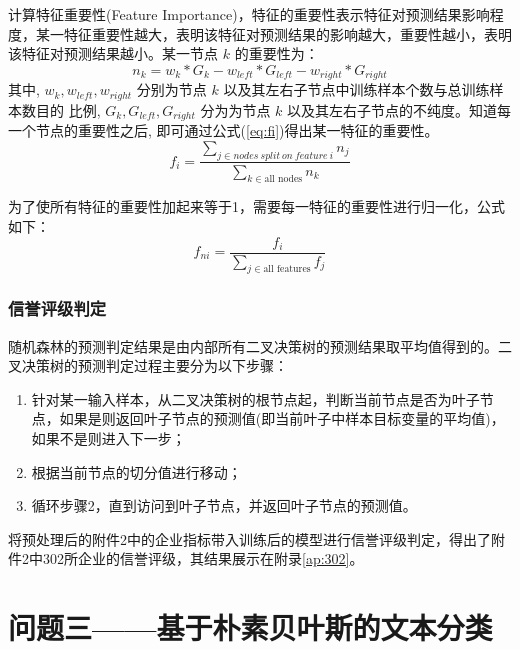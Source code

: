 \documentclass[withoutpreface,bwprint]{cumcmthesis} %
\begin{document}
计算特征重要性(Feature Importance)，特征的重要性表示特征对预测结果影响程度，某一特征重要性越大，表明该特征对预测结果的影响越大，重要性越小，表明该特征对预测结果越小。某一节点 $k$ 的重要性为：
\begin{equation}
n_{k}=w_{k} * G_{k}-w_{l e f t} * G_{l e f t}-w_{r i g h t} * G_{r i g h t}
\end{equation}
其中, $w_{k}, w_{l e f t}, w_{r i g h t}$ 分别为节点 $k$ 以及其左右子节点中训练样本个数与总训练样本数目的 比例, $G_{k}, G_{l e f t}, G_{r i g h t}$ 分为为节点 $k$ 以及其左右子节点的不纯度。知道每一个节点的重要性之后, 即可通过公式(\ref{eq:fi})得出某一特征的重要性。
\begin{equation}\label{eq:fi}
f_{i}=\frac{\sum_{j \in n o d e s ~ s p l i t ~ o n ~ f e a t u r e ~i} n_j}{\sum_{k \in \text {all nodes}} n_{k}}
\end{equation}

为了使所有特征的重要性加起来等于1，需要每一特征的重要性进行归一化，公式如下：
\begin{equation}
f_{n i}=\frac{f_{i}}{\sum_{j \in \text {all features}} f_{j}}
\end{equation}

\subsubsection{信誉评级判定}
随机森林的预测判定结果是由内部所有二叉决策树的预测结果取平均值得到的。二叉决策树的预测判定过程主要分为以下步骤：
\begin{enumerate}
	\item 针对某一输入样本，从二叉决策树的根节点起，判断当前节点是否为叶子节点，如果是则返回叶子节点的预测值(即当前叶子中样本目标变量的平均值)，如果不是则进入下一步；
	\item 根据当前节点的切分值进行移动；
	\item 循环步骤2，直到访问到叶子节点，并返回叶子节点的预测值。
\end{enumerate}

将预处理后的附件2中的企业指标带入训练后的模型进行信誉评级判定，得出了附件2中302所企业的信誉评级，其结果展示在附录\ref{ap:302}。



\section{问题三——基于朴素贝叶斯的文本分类}
\end{document}
